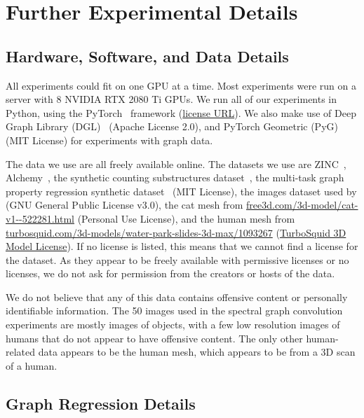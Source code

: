 \documentclass{article} \usepackage{iclr2023_conference,times}
\begin{document}
\section{Further Experimental Details}

\subsection{Hardware, Software, and Data Details}\label{appendix:other_exp_details}

All experiments could fit on one GPU at a time. Most experiments were run on a server with 8 NVIDIA RTX 2080 Ti GPUs. We run all of our experiments in Python, using the PyTorch~\citep{paszke2019pytorch} framework (\href{https://github.com/pytorch/pytorch/blob/master/LICENSE}{license URL}). We also make use of Deep Graph Library (DGL)~\citep{wang2019deep} (Apache License 2.0), and PyTorch Geometric (PyG)~\citep{fey2019fast} (MIT License) for experiments with graph data.

The data we use are all freely available online. The datasets we use are 
ZINC~\citep{irwin2012zinc},
Alchemy~\citep{chen2019alchemy},
the synthetic counting substructures dataset~\citep{chen2020can},
the multi-task graph property regression synthetic dataset~\citep{corso2020principal} (MIT License),
the images dataset used by \citet{balcilar2020analyzing} (GNU General Public License v3.0),
the cat mesh from \url{free3d.com/3d-model/cat-v1--522281.html} (Personal Use License),
and the human mesh from \url{turbosquid.com/3d-models/water-park-slides-3d-max/1093267} (\href{https://blog.turbosquid.com/turbosquid-3d-model-license/}{TurboSquid 3D Model License}). If no license is listed, this means that we cannot find a license for the dataset. As they appear to be freely available with permissive licenses or no licenses, we do not ask for permission from the creators or hosts of the data.

We do not believe that any of this data contains offensive content or personally identifiable information. The 50 images used in the spectral graph convolution experiments are mostly images of objects, with a few low resolution images of humans that do not appear to have offensive content. The only other human-related data appears to be the human mesh, which appears to be from a 3D scan of a human. 

\subsection{Graph Regression Details}\label{appendix:graph_regression}
\end{document}
